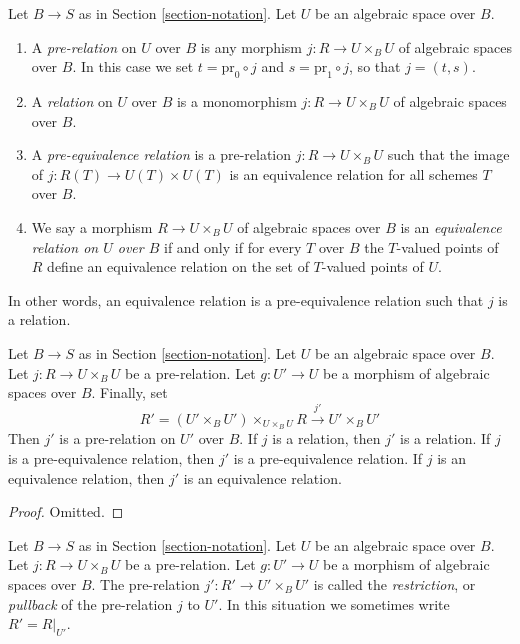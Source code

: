\begin{definition}
\label{definition-equivalence-relation}
Let $B \to S$ as in Section \ref{section-notation}.
Let $U$ be an algebraic space over $B$.
\begin{enumerate}
\item A {\it pre-relation} on $U$ over $B$ is any morphism
$j : R \to U \times_B U$ of algebraic spaces over $B$.
In this case we set
$t = \text{pr}_0 \circ j$ and $s = \text{pr}_1 \circ j$, so
that $j = (t, s)$.
\item A {\it relation} on $U$ over $B$ is a monomorphism
$j : R \to U \times_B U$ of algebraic spaces over $B$.
\item A {\it pre-equivalence relation} is a pre-relation
$j : R \to U\times_B U$ such that the image of
$j : R(T) \to U(T) \times U(T)$ is an equivalence relation for
all schemes $T$ over $B$.
\item We say a morphism $R \to U \times_B U$ of algebraic spaces over $B$
is an {\it equivalence relation on $U$ over $B$}
if and only if for every $T$ over $B$ the $T$-valued
points of $R$ define an equivalence relation
on the set of $T$-valued points of $U$.
\end{enumerate}
\end{definition}

\noindent
In other words, an equivalence relation is a pre-equivalence relation
such that $j$ is a relation.

\begin{lemma}
\label{lemma-restrict-relation}
Let $B \to S$ as in Section \ref{section-notation}.
Let $U$ be an algebraic space over $B$.
Let $j : R \to U \times_B U$ be a pre-relation.
Let $g : U' \to U$ be a morphism of algebraic spaces over $B$.
Finally, set
$$
R' = (U' \times_B U')\times_{U \times_B U} R
\xrightarrow{j'}
U' \times_B U'
$$
Then $j'$ is a pre-relation on $U'$ over $B$.
If $j$ is a relation, then $j'$ is a relation.
If $j$ is a pre-equivalence relation, then $j'$ is a pre-equivalence relation.
If $j$ is an equivalence relation, then $j'$ is an equivalence relation.
\end{lemma}

\begin{proof}
Omitted.
\end{proof}

\begin{definition}
\label{definition-restrict-relation}
Let $B \to S$ as in Section \ref{section-notation}.
Let $U$ be an algebraic space over $B$.
Let $j : R \to U \times_B U$ be a pre-relation.
Let $g : U' \to U$ be a morphism of algebraic spaces over $B$.
The pre-relation $j' : R' \to U' \times_B U'$ is called
the {\it restriction}, or {\it pullback} of the pre-relation $j$ to $U'$.
In this situation we sometimes write $R' = R|_{U'}$.
\end{definition}

